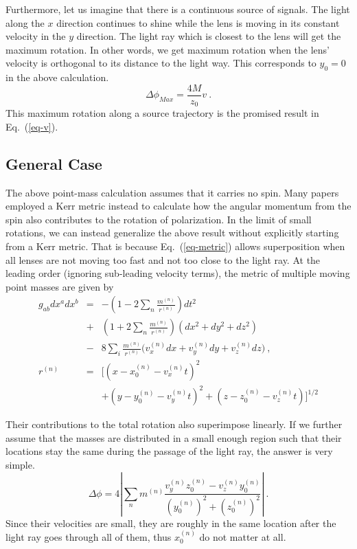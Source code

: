 \documentclass[aps,showpacs,twocolumn,floats,prd,superscriptaddress,nofootinbib]{revtex4-1}
\begin{document}
Furthermore, let us imagine that there is a continuous source of signals.
The light along the $x$ direction continues to shine while the lens is moving in its constant velocity in the $y$ direction.
The light ray which is closest to the lens will get the maximum rotation.
In other words, we get maximum rotation when the lens' velocity is orthogonal to its distance to the light way.
This corresponds to $y_0=0$ in the above calculation.
\begin{equation}
\Delta \phi_{Max} = \frac{4M}{z_0}v ~.
\end{equation}
This maximum rotation along a source trajectory is the promised result in Eq.~(\ref{eq-v}).

\subsection{General Case}

The above point-mass calculation assumes that it carries no spin. 
Many papers employed a Kerr metric instead to calculate how the angular momentum from the spin also contributes to the rotation of polarization. 
In the limit of small rotations, we can instead generalize the above result without explicitly starting from a Kerr metric. 
That is because Eq.~(\ref{eq-metric}) allows superposition when all lenses are not moving too fast and not too close to the light ray. 
At the leading order (ignoring sub-leading velocity terms), the metric of multiple moving point masses are given by
\begin{eqnarray}
g_{ab}dx^adx^b &=& -\left( 1 - 2\sum_n \frac{m^{(n)}}{r^{(n)}} \right)dt^2
 \\ \nonumber
&+& \left( 1 + 2\sum_n \frac{m^{(n)}}{r^{(n)}} \right) (dx^2+dy^2+dz^2) 
\\ \nonumber
&-& 8\sum_i \frac{m^{(n)} }{r^{(n)}}
\biggl(v^{(n)}_x dx  + v^{(n)}_y dy+ v^{(n)}_z dz\biggr)~, \\
r^{(n)} &=& \bigg[\left(x - x_0^{(n)} - v^{(n)}_x t\right)^2 
\\ \nonumber
& & + \left(y - y_0^{(n)} - v^{(n)}_y t\right)^2 
+ \left(z - z_0^{(n)} - v^{(n)}_z t\right) \bigg]^{1/2}
\end{eqnarray}

Their contributions to the total rotation also superimpose linearly. 
If we further assume that the masses are distributed in a small enough region such that their locations stay the same during the passage of the light ray, the answer is very simple. 
\begin{equation}
\Delta\phi = 4 \left| \sum_n m^{(n)} \frac{v_y^{(n)}z_0^{(n)} - v_z^{(n)}y_0^{(n)}}
{\left(y_0^{(n)}\right)^2+\left(z_0^{(n)}\right)^2} \right|~.
\label{eq-combine}
\end{equation}
Since their velocities are small, they are roughly in the same location after the light ray goes through all of them, thus $x_0^{(n)}$ do not matter at all. 
\end{document}
